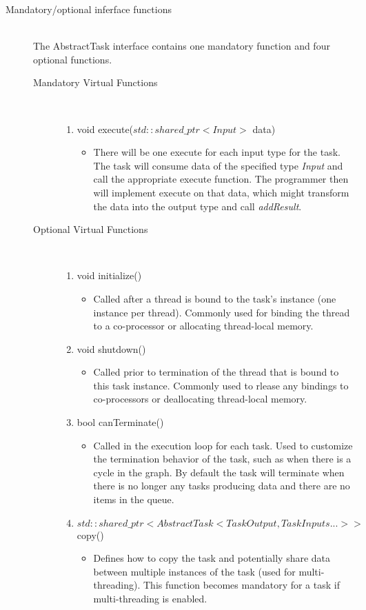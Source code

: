 \documentclass[]{article}
\begin{document}
\begin{description}
	\item[Mandatory/optional inferface functions] \hfill \\
		The AbstractTask interface contains one mandatory function and four optional functions.
		\begin{description}
			\item[Mandatory Virtual Functions] \hfill \\
			\begin{enumerate}
				\item void execute($std::shared\_ptr<Input>$ data)
				\begin{itemize}
					\item There will be one execute for each input type for the task. The task will consume data of the specified type \emph{Input} and call the appropriate execute function. The programmer then will implement execute on that data, which might transform the data into the output type and call \textit{addResult}.					
				\end{itemize}		
			\end{enumerate}
			\item[Optional Virtual Functions] \hfill \\
			\begin{enumerate}
				\item void initialize()
				\begin{itemize}
					\item Called after a thread is bound to the task's instance (one instance per thread). Commonly used for binding the thread to a co-processor or allocating thread-local memory.
				\end{itemize}
				\item void shutdown()
				\begin{itemize}
					\item Called prior to termination of the thread that is bound to this task instance. Commonly used to rlease any bindings to co-processors or deallocating thread-local memory.
				\end{itemize}
				\item bool canTerminate()
				\begin{itemize}
					\item Called in the execution loop for each task. Used to customize the termination behavior of the task, such as when there is a cycle in the graph. By default the task will terminate when there is no longer any tasks producing data and there are no items in the queue.
				\end{itemize}
				\item $std::shared\_ptr<AbstractTask<TaskOutput, TaskInputs...>>$ copy()
				\begin{itemize}
					\item Defines how to copy the task and potentially share data between multiple instances of the task (used for multi-threading). This function becomes mandatory for a task if multi-threading is enabled.
				\end{itemize}
			\end{enumerate}
		\end{description}
	
\end{description}
\end{document}
